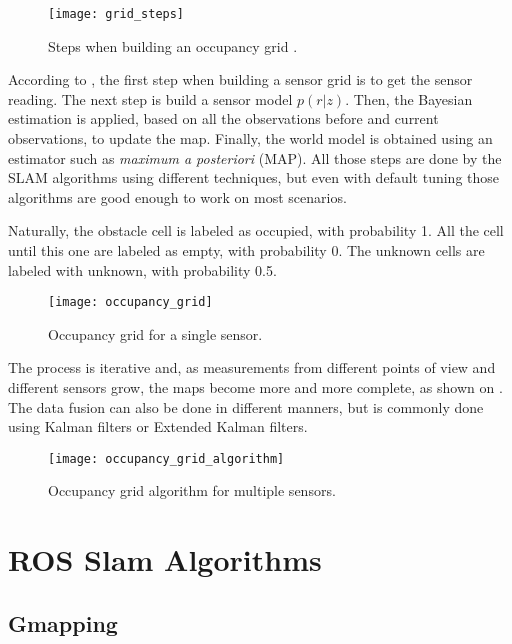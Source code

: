 \begin{figure}[!ht]
    \centering
    \texttt{[image: grid\_steps]}
    \caption{Steps when building an occupancy grid \cite{elfes1989using}.}
    \label{fig:grid_steps}
\end{figure}

According to , the first step when building a sensor grid is to get the sensor reading. The next step is build a sensor model $p(r|z)$. Then, the Bayesian estimation is applied, based on all the observations before and current observations, to update the map. Finally, the world model is obtained using an estimator such as \textit{maximum a posteriori} (MAP). All those steps are done by the SLAM algorithms using different techniques, but even with default tuning those algorithms are good enough to work on most scenarios.

Naturally, the obstacle cell is labeled as occupied, with probability 1. All the cell until this one are labeled as empty, with probability 0. The unknown cells are labeled with unknown, with probability 0.5.

\begin{figure}[!ht]
    \centering
    \texttt{[image: occupancy\_grid]}
    \caption{Occupancy grid for a single sensor.}
    \label{fig:occupancy_grid}
\end{figure}

The process is iterative and, as measurements from different points of view and different sensors grow, the maps become more and more complete, as shown on . The data fusion can also be done in different manners, but is commonly done using Kalman filters or Extended Kalman filters.

\begin{figure}[!ht]
    \centering
    \texttt{[image: occupancy\_grid\_algorithm]}
    \caption{Occupancy grid algorithm for multiple sensors.}
    \label{fig:occupancy_grid_algorithm}
\end{figure}

\section{ROS Slam Algorithms}

\subsection{Gmapping}

